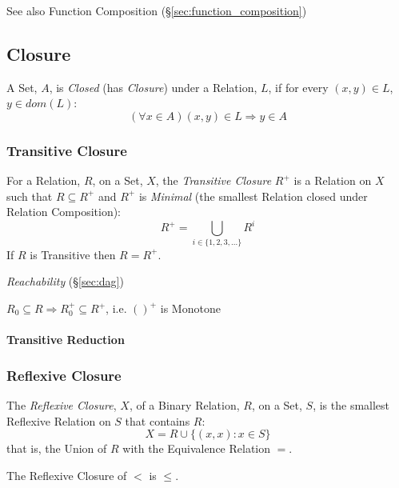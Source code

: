 See also Function Composition (\S\ref{sec:function_composition})



\subsection{Closure}\label{sec:set_closure}

A Set, $A$, is \emph{Closed} (has \emph{Closure}) under a Relation,
$L$, if for every $(x,y) \in L$, $y \in dom(L)$:
\[
  (\forall x \in A) (x,y) \in L \Rightarrow y \in A
\]



\subsubsection{Transitive Closure}\label{sec:transitive_closure}

For a Relation, $R$, on a Set, $X$, the \emph{Transitive Closure}
$R^+$ is a Relation on $X$ such that $R \subseteq R^+$ and $R^+$ is
\emph{Minimal} (the smallest Relation closed under Relation
Composition):
\[
  R^+ = \bigcup_{i \in \{1,2,3,...\}} R^i
\]
If $R$ is Transitive then $R = R^+$.

\emph{Reachability} (\S\ref{sec:dag})

$R_0 \subseteq R \Rightarrow R_0^+ \subseteq R^+$, i.e. $()^+$ is
Monotone \cite{aczel88}



\paragraph{Transitive Reduction}\label{sec:transitive_reduction}\hfill



\subsubsection{Reflexive Closure}\label{sec:reflexive_closure}

The \emph{Reflexive Closure}, $X$, of a Binary Relation, $R$, on a
Set, $S$, is the smallest Reflexive Relation on $S$ that contains $R$:
\[
  X = R \cup \{(x,x) : x \in S\}
\]
that is, the Union of $R$ with the Equivalence Relation $=$.

The Reflexive Closure of $<$ is $\leq$.



